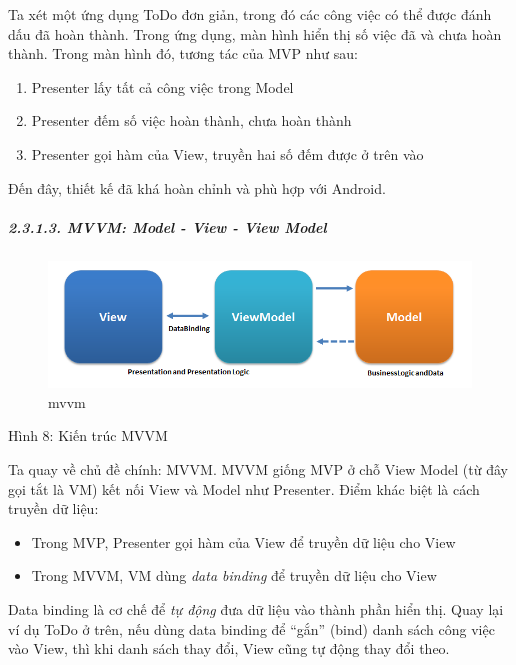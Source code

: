 \documentclass[
]{article}
\providecommand{\tightlist}{%
  \setlength{\itemsep}{0pt}\setlength{\parskip}{0pt}}
\begin{document}
Ta xét một ứng dụng ToDo đơn giản, trong đó các công việc có thể được
đánh dấu đã hoàn thành. Trong ứng dụng, màn hình hiển thị số việc đã và
chưa hoàn thành. Trong màn hình đó, tương tác của MVP như sau:

\begin{enumerate}
\def\labelenumi{\arabic{enumi}.}
\tightlist
\item
  Presenter lấy tất cả công việc trong Model
\item
  Presenter đếm số việc hoàn thành, chưa hoàn thành
\item
  Presenter gọi hàm của View, truyền hai số đếm được ở trên vào
\end{enumerate}

Đến đây, thiết kế đã khá hoàn chỉnh và phù hợp với Android.

\hypertarget{mvvm-model---view---view-model}{%
\subparagraph{2.3.1.3. MVVM: Model - View - View
Model}\label{mvvm-model---view---view-model}}

\begin{figure}
\centering
\includegraphics{../images/MVVMPattern.png}
\caption{mvvm}
\end{figure}

Hình 8: Kiến trúc MVVM

Ta quay về chủ đề chính: MVVM. MVVM giống MVP ở chỗ View Model (từ đây
gọi tắt là VM) kết nối View và Model như Presenter. Điểm khác biệt là
cách truyền dữ liệu:

\begin{itemize}
\tightlist
\item
  Trong MVP, Presenter gọi hàm của View để truyền dữ liệu cho View
\item
  Trong MVVM, VM dùng \emph{data binding} để truyền dữ liệu cho View
\end{itemize}

Data binding là cơ chế để \emph{tự động} đưa dữ liệu vào thành phần hiển
thị. Quay lại ví dụ ToDo ở trên, nếu dùng data binding để ``gắn'' (bind)
danh sách công việc vào View, thì khi danh sách thay đổi, View cũng tự
động thay đổi theo.
\end{document}
